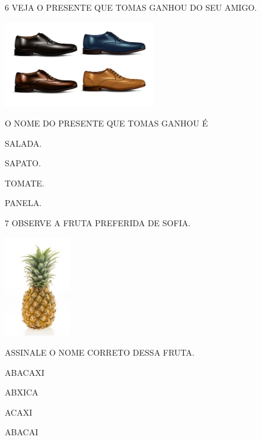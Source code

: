 \num{6} VEJA O PRESENTE QUE TOMAS GANHOU DO SEU AMIGO.

\includegraphics[width=2.60694in,height=1.48889in]{media/image191.jpg}


O NOME DO PRESENTE QUE TOMAS GANHOU É

\begin{escolha}
\item SALADA.

\item SAPATO.

\item TOMATE.

\item PANELA.
\end{escolha}


\num{7} OBSERVE A FRUTA PREFERIDA DE SOFIA.

\includegraphics[width=1.15208in,height=1.72708in]{media/image192.jpg}


ASSINALE O NOME CORRETO DESSA FRUTA.

\begin{escolha}
\item ABACAXI

\item ABXICA

\item ACAXI

\item ABACAI
\end{escolha}

